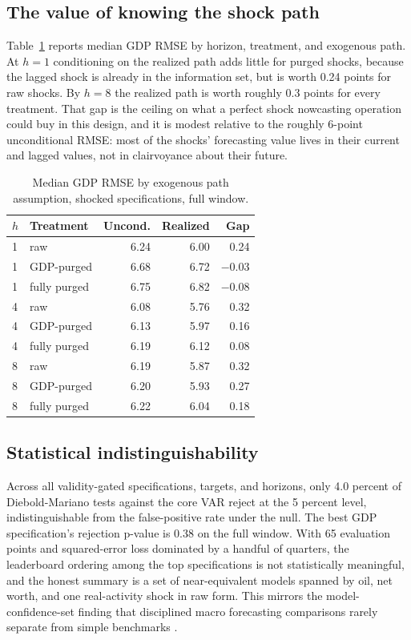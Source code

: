 \documentclass[conference]{IEEEtran}
\begin{document}
\subsection{The value of knowing the shock path}
Table~\ref{tab:path} reports median GDP RMSE by horizon, treatment, and exogenous path. At $h=1$ conditioning on the realized path adds little for purged shocks, because the lagged shock is already in the information set, but is worth 0.24 points for raw shocks. By $h=8$ the realized path is worth roughly 0.3 points for every treatment. That gap is the ceiling on what a perfect shock nowcasting operation could buy in this design, and it is modest relative to the roughly 6-point unconditional RMSE: most of the shocks' forecasting value lives in their current and lagged values, not in clairvoyance about their future.

\begin{table}[t]
\caption{Median GDP RMSE by exogenous path assumption, shocked specifications, full window.}
\label{tab:path}
\centering
\small
\begin{tabular}{@{}llrrr@{}}
\toprule
$h$ & Treatment & Uncond. & Realized & Gap \\
\midrule
1 & raw & 6.24 & 6.00 & 0.24 \\
1 & GDP-purged & 6.68 & 6.72 & $-$0.03 \\
1 & fully purged & 6.75 & 6.82 & $-$0.08 \\
4 & raw & 6.08 & 5.76 & 0.32 \\
4 & GDP-purged & 6.13 & 5.97 & 0.16 \\
4 & fully purged & 6.19 & 6.12 & 0.08 \\
8 & raw & 6.19 & 5.87 & 0.32 \\
8 & GDP-purged & 6.20 & 5.93 & 0.27 \\
8 & fully purged & 6.22 & 6.04 & 0.18 \\
\bottomrule
\end{tabular}
\end{table}

\subsection{Statistical indistinguishability}
Across all validity-gated specifications, targets, and horizons, only 4.0 percent of Diebold-Mariano tests against the core VAR reject at the 5 percent level, indistinguishable from the false-positive rate under the null. The best GDP specification's rejection p-value is 0.38 on the full window. With 65 evaluation points and squared-error loss dominated by a handful of quarters, the leaderboard ordering among the top specifications is not statistically meaningful, and the honest summary is a set of near-equivalent models spanned by oil, net worth, and one real-activity shock in raw form. This mirrors the model-confidence-set finding that disciplined macro forecasting comparisons rarely separate from simple benchmarks \cite{hansen2011}.
\end{document}
